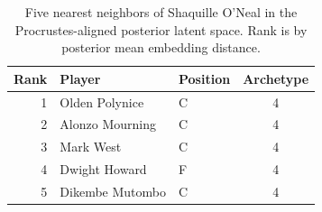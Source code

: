 \begin{table}[htbp]
  \centering\small
  \begin{tabular}{rllc}
    \toprule
    Rank & Player & Position & Archetype \\
    \midrule
    1 & Olden Polynice & C & 4 \\
    2 & Alonzo Mourning & C & 4 \\
    3 & Mark West & C & 4 \\
    4 & Dwight Howard & F & 4 \\
    5 & Dikembe Mutombo & C & 4 \\
    \bottomrule
  \end{tabular}
  \caption{Five nearest neighbors of Shaquille O'Neal in the Procrustes-aligned posterior latent space. Rank is by posterior mean embedding distance.}
  \label{tab:Shaquille_O_Neal_neighbors}
\end{table}

